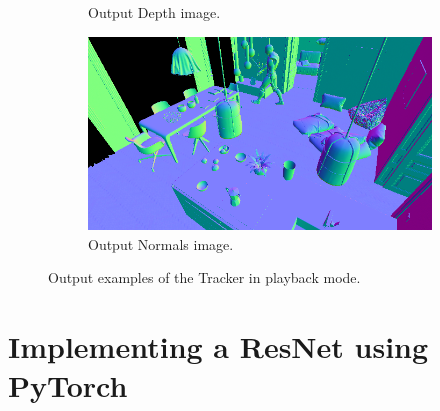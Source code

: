 \begin{figure}
\begin{subfigure}[b]{0.475\textwidth}
		\caption[Output Depth image.]%
		{{\small Output Depth image.}}    
		\label{fig:generated_depth}
	\end{subfigure}
	\quad
	\begin{subfigure}[b]{0.475\textwidth}   
		\centering 
		\includegraphics[width=\textwidth]{archivos/generated_normals.png}
		\caption[Output Normals image.]%
		{{\small Output Normals image.}}    
		\label{fig:generated_normals}
	\end{subfigure}
	\caption{Output examples of the Tracker in playback mode.}
	\label{fig:playback_output}
\end{figure}

\section{Implementing a ResNet using PyTorch}




